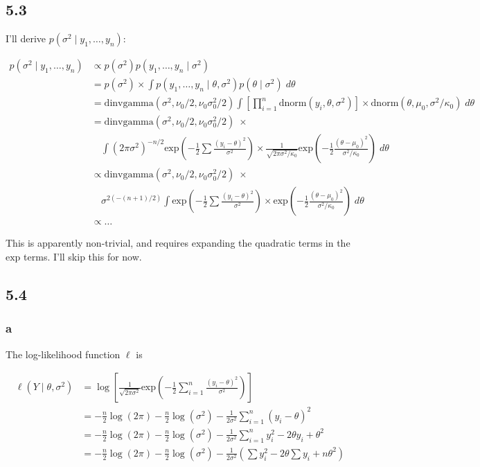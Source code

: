 \documentclass[]{article}
\begin{document}
\hypertarget{section-2}{%
\subsection{5.3}\label{section-2}}

I'll derive \(p(\sigma^2 \mid y_1, \dots, y_n)\):

\begin{align}
p(\sigma^2 \mid y_1, \dots, y_n) &\propto p(\sigma^2)p(y_1, \dots, y_n \mid \sigma^2) \\
&= p(\sigma^2) \times \int p(y_1, \dots, y_n \mid \theta, \sigma^2) p(\theta \mid \sigma^2) \; d\theta \\
&= \text{dinvgamma}(\sigma^2, \nu_0 / 2, \nu_0 \sigma_0^2 / 2) \int \left[ \prod_{i=1}^n \text{dnorm}(y_i, \theta, \sigma^2) \right] \times \text{dnorm}(\theta, \mu_0, \sigma^2 / \kappa_0)\; d\theta \\
&= \text{dinvgamma}(\sigma^2, \nu_0 / 2, \nu_0 \sigma_0^2 / 2) \; \times \\ &\quad \int (2\pi
\sigma^2)^{-n/2} \text{exp}\left( -\frac{1}{2} \sum \frac{(y_i -
\theta)^2}{\sigma^2} \right) \times \frac{1}{\sqrt{2\pi\sigma^2 / \kappa_0}}
\text{exp}\left(-\frac{1}{2} \frac{(\theta - \mu_0)^2}{\sigma^2 / \kappa_0}\right) \; d\theta \\
&\propto \text{dinvgamma}(\sigma^2, \nu_0 / 2, \nu_0 \sigma_0^2 / 2) \; \times \\ &\quad \sigma^{2(-(n + 1)/2)} \int \text{exp}\left( -\frac{1}{2} \sum \frac{(y_i -
\theta)^2}{\sigma^2} \right) \times 
\text{exp}\left(-\frac{1}{2} \frac{(\theta - \mu_0)^2}{\sigma^2 / \kappa_0}\right) \; d\theta \\
&\propto \dots
\end{align}

This is apparently non-trivial, and requires expanding the quadratic
terms in the \(\text{exp}\) terms. I'll skip this for now.

\hypertarget{section-3}{%
\subsection{5.4}\label{section-3}}

\hypertarget{a-1}{%
\subsubsection{a}\label{a-1}}

The log-likelihood function \(\ell\) is

\begin{align}
\ell(Y \mid \theta, \sigma^2) &= \log \left[ \frac{1}{\sqrt{2\pi\sigma^2}} \text{exp}\left(-\frac{1}{2}\sum_{i=1}^n \frac{(y_i - \theta)^2}{\sigma^2} \right) \right] \\
&= -\frac{n}{2} \log(2\pi) - \frac{n}{2}\log(\sigma^2) - \frac{1}{2\sigma^2} \sum_{i=1}^n (y_i - \theta)^2 \\
&= -\frac{n}{2} \log(2\pi) - \frac{n}{2}\log(\sigma^2) - \frac{1}{2\sigma^2} \sum_{i=1}^n y_i^2 -2\theta y_i + \theta^2 \\
&= -\frac{n}{2} \log(2\pi) - \frac{n}{2}\log(\sigma^2) - \frac{1}{2\sigma^2} \left(  \sum y_i^2 - 2\theta \sum y_i + n \theta^2 \right)
\end{align}
\end{document}
